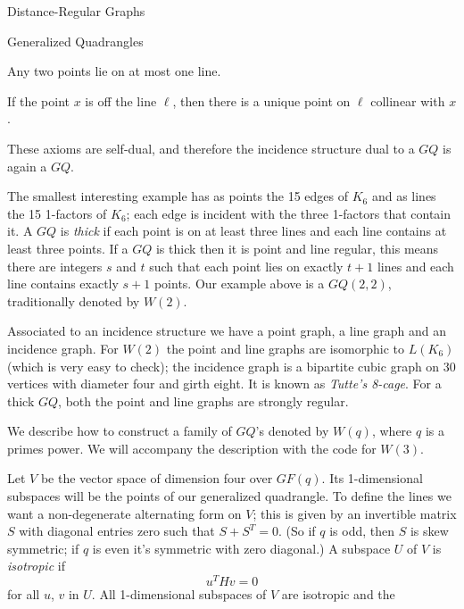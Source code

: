 \begin{chap}{Distance-Regular Graphs}
\begin{sect}{Generalized Quadrangles}
\begin{enumerate}
\begin{listitem}
    Any two points lie on at most one line.
    \end{listitem}
    \begin{listitem}
    If the point $x$ is off the line $\ell$, then there is a unique
    point on $\ell$ collinear with $x$.
    \end{listitem}
\end{enumerate}
%
\begin{para}
These axioms are self-dual, and therefore the incidence structure
dual to a $GQ$ is again a $GQ$.
\end{para}
%
\begin{para}
The smallest interesting example has as points the 15 edges of $K_6$ and
as lines the 15 1-factors of $K_6$; each edge is incident with the three
1-factors that contain it. A $GQ$ is \textsl{thick} if each point is on at least 
three lines and each line contains at least three points. If a $GQ$ is thick then
it is point and line regular, this means there are integers $s$ and $t$ such that
each point lies on exactly $t+1$ lines and each line contains exactly $s+1$
points. Our example above is a $GQ(2,2)$, traditionally denoted by $W(2)$.
\end{para}
%
\begin{para}
Associated to an incidence structure we have a point graph, a line graph
and an incidence graph.  For $W(2)$ the point and line graphs are isomorphic
to $L(K_6)$ (which is very easy to check); the incidence graph is
a bipartite cubic graph on 30 vertices with diameter four and girth eight.
It is known as \textsl{Tutte's 8-cage}. For a thick $GQ$, both the point
and line graphs are strongly regular.
\end{para}
%
\begin{para}
We describe how to construct a family of $GQ$'s denoted by $W(q)$, where
$q$ is a primes power. We will accompany the description with the
code for $W(3)$.
\end{para}
%
\begin{para}
Let $V$ be the vector space of dimension four over $GF(q)$. Its 1-dimensional
subspaces will be the points of our generalized quadrangle. To define
the lines we want a non-degenerate alternating form on $V$; this is
given by an invertible matrix $S$ with diagonal entries zero such that $S+S^T=0$.
(So if $q$ is odd, then $S$ is skew symmetric; if $q$ is even it's symmetric
with zero diagonal.) A subspace $U$ of $V$ is \textsl{isotropic}
if
\[
    u^THv = 0
\]
for all $u$, $v$ in $U$. All 1-dimensional subspaces of $V$ are isotropic and the

\end{para}
\end{sect}
\end{chap}

